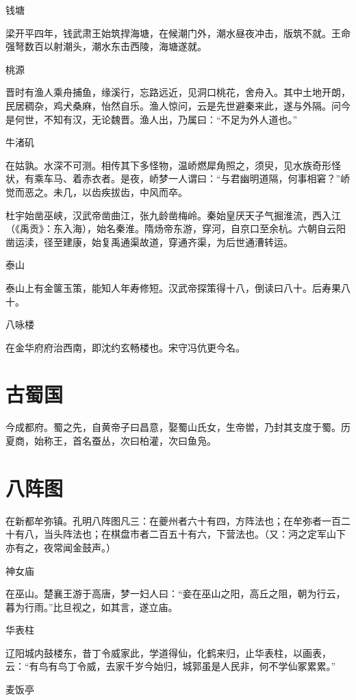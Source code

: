 \documentclass[a4paper,12pt,UTF8,twoside]{ctexbook}
\begin{document}
	钱塘
	
	梁开平四年，钱武肃王始筑捍海塘，在候潮门外，潮水昼夜冲击，版筑不就。王命强弩数百以射潮头，潮水东击西陵，海塘遂就。
	
	桃源
	
	晋时有渔人乘舟捕鱼，缘溪行，忘路远近，见洞口桃花，舍舟入。其中土地开朗，民居稠杂，鸡犬桑麻，怡然自乐。渔人惊问，云是先世避秦来此，遂与外隔。问今是何世，不知有汉，无论魏晋。渔人出，乃属曰：“不足为外人道也。”
	
	牛渚矶
	
	在姑孰。水深不可测。相传其下多怪物，温峤燃犀角照之，须臾，见水族奇形怪状，有乘车马、着赤衣者。是夜，峤梦一人谓曰：“与君幽明道隔，何事相窘？”峤觉而恶之。未几，以齿疾拔齿，中风而卒。
	
	杜宇始凿巫峡，汉武帝凿曲江，张九龄凿梅岭。秦始皇厌天子气掘淮流，西入江（《禹贡》：东入海），始名秦淮。隋炀帝东游，穿河，自京口至余杭。六朝自云阳凿运渎，径至建康，始复禹通渠故道，穿通齐渠，为后世通漕转运。
	
	泰山
	
	泰山上有金箧玉策，能知人年寿修短。汉武帝探策得十八，倒读曰八十。后寿果八十。
	
	八咏楼
	
	在金华府府治西南，即沈约玄畅楼也。宋守冯伉更今名。
	
	\section{古蜀国}
	
	今成都府。蜀之先，自黄帝子曰昌意，娶蜀山氏女，生帝喾，乃封其支度于蜀。历夏商，始称王，首名蚕丛，次曰柏灌，次曰鱼凫。
	
	\section{八阵图}
	
	在新都牟弥镇。孔明八阵图凡三：在夔州者六十有四，方阵法也；在牟弥者一百二十有八，当头阵法也；在棋盘市者二百五十有六，下营法也。（又：沔之定军山下亦有之，夜常闻金鼓声。）
	
	神女庙
	
	在巫山。楚襄王游于高唐，梦一妇人曰：“妾在巫山之阳，高丘之阻，朝为行云，暮为行雨。”比旦视之，如其言，遂立庙。
	
	华表柱
	
	辽阳城内鼓楼东，昔丁令威家此，学道得仙，化鹤来归，止华表柱，以画表，云：“有鸟有鸟丁令威，去家千岁今始归，城郭虽是人民非，何不学仙冢累累。”
	
	麦饭亭
	
\end{document}
